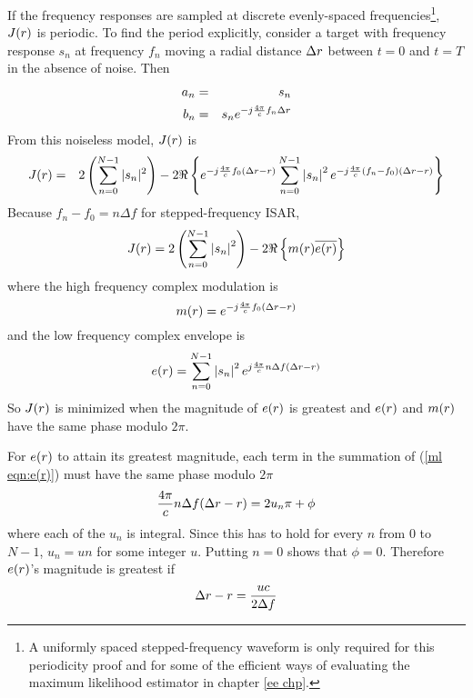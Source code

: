 If the frequency responses are sampled at discrete evenly-spaced
frequencies\footnote{A uniformly spaced stepped-frequency waveform is only
required for this periodicity proof and for some of the efficient ways of
evaluating the maximum likelihood estimator in chapter 
\protect\ref{ee chp}.}, $J({r})$ is periodic.  To find the period explicitly, 
consider a target with frequency response $s_n$ at frequency $f_n$ moving a
radial distance ${\Delta r}$ between $t=0$ and $t=T$ in the absence of noise. Then
\begin{eqnarray}
a_n&=&s_n{\nonumber}\\
b_n&=&s_n{e^{-j{\frac{4\pi}{c}} f_n{\Delta r}}}\label{ml eqn:general target}
\end{eqnarray}
From this noiseless model, $J({r})$ is
\begin{eqnarray}
J({r})&=&2\left(\sum_{n=0}^{N-1}|s_n|^2\right)-2\Re\left\{
{e^{-j{\frac{4\pi}{c}} f_0({\Delta r}-{r})}}\sum_{n=0}^{N-1}\left|s_n\right|^2
{e^{-j\frac{4\pi}{c}(f_n-f_0)({\Delta r}-{r})}}\right\}
\end{eqnarray}
Because $f_n-f_0=n\Delta f$ for stepped-frequency ISAR,
\begin{equation}
J({r})=2\left(\sum_{n=0}^{N-1}\left|s_n\right|^2\right)
-2\Re\left\{m({r})\overline{e({r})}\right\}
\end{equation}
where the high frequency complex modulation is
\begin{equation}
m({r})={e^{-j{\frac{4\pi}{c}} f_0({\Delta r}-{r})}}
\end{equation}
and the low frequency complex envelope is
\begin{equation}\label{ml eqn:e(r)}
e({r})=\sum_{n=0}^{N-1}\left|s_n\right|^2{e^{j\frac{4\pi}{c}n\Delta f({\Delta r}-{r})}}
\end{equation}
So $J({r})$ is minimized when the magnitude of $e({r})$ is greatest and $e({r})$ and
$m({r})$ have the same phase modulo $2\pi$.

For $e({r})$ to attain its greatest magnitude, each term in the summation 
of (\ref{ml eqn:e(r)}) must have the same phase modulo $2\pi$
\begin{equation}
\frac{4\pi}{c}n\Delta f({\Delta r}-{r})=2u_n\pi +\phi
\end{equation}
where each of the $u_n$ is integral.  Since this has to hold for every $n$
from $0$ to $N-1$, $u_n=un$ for some integer $u$. Putting $n=0$ shows 
that $\phi=0$.  Therefore $e({r})$'s magnitude is greatest if
\begin{equation}\label{ml eqn:kcondit}
{\Delta r}-{r}=\frac{uc}{2\Delta f}
\end{equation}


